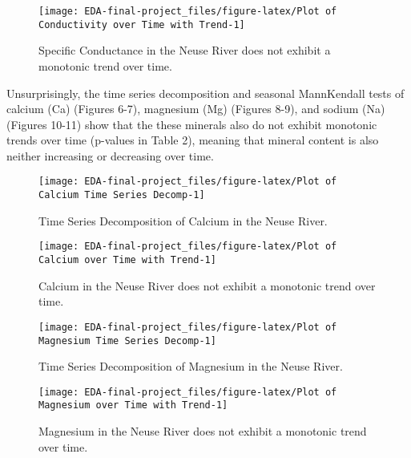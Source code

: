 \documentclass[
  12pt,
]{article}
\begin{document}
\begin{figure}

{\centering \texttt{[image: EDA-final-project\_files/figure-latex/Plot of Conductivity over Time with Trend-1]} 

}

\caption{Specific Conductance in the Neuse River does not exhibit a monotonic trend over time.}\label{fig:Plot of Conductivity over Time with Trend}
\end{figure}

\newpage

Unsurprisingly, the time series decomposition and seasonal MannKendall
tests of calcium (Ca) (Figures 6-7), magnesium (Mg) (Figures 8-9), and
sodium (Na) (Figures 10-11) show that the these minerals also do not
exhibit monotonic trends over time (p-values in Table 2), meaning that
mineral content is also neither increasing or decreasing over time.

\begin{figure}

{\centering \texttt{[image: EDA-final-project\_files/figure-latex/Plot of Calcium Time Series Decomp-1]} 

}

\caption{Time Series Decomposition of Calcium in the Neuse River.}\label{fig:Plot of Calcium Time Series Decomp}
\end{figure}

\begin{figure}

{\centering \texttt{[image: EDA-final-project\_files/figure-latex/Plot of Calcium over Time with Trend-1]} 

}

\caption{Calcium in the Neuse River does not exhibit a monotonic trend over time.}\label{fig:Plot of Calcium over Time with Trend}
\end{figure}

\begin{figure}

{\centering \texttt{[image: EDA-final-project\_files/figure-latex/Plot of Magnesium Time Series Decomp-1]} 

}

\caption{Time Series Decomposition of Magnesium in the Neuse River.}\label{fig:Plot of Magnesium Time Series Decomp}
\end{figure}

\begin{figure}

{\centering \texttt{[image: EDA-final-project\_files/figure-latex/Plot of Magnesium over Time with Trend-1]} 

}

\caption{Magnesium in the Neuse River does not exhibit a monotonic trend over time.}\label{fig:Plot of Magnesium over Time with Trend}
\end{figure}
\end{document}
